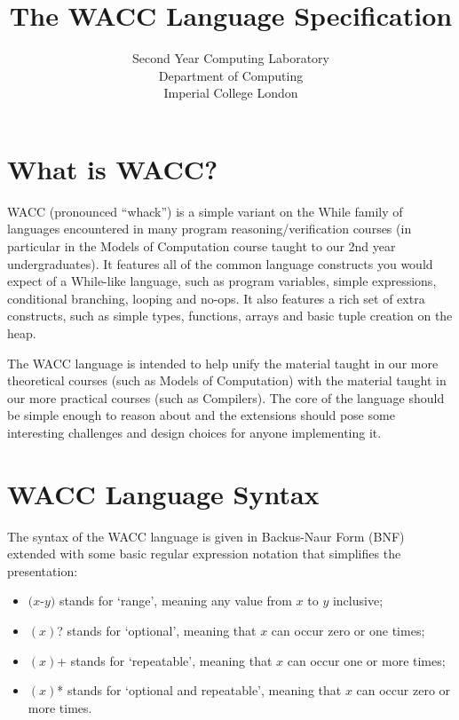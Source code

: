 \documentclass[a4paper]{article}
\theoremstyle{definition}
\begin{document}
\title{The WACC Language Specification}
\date{}
\author{
Second Year Computing Laboratory \\
Department of Computing \\
Imperial College London
}

\maketitle

\section{What is WACC?}
WACC (pronounced ``whack'') is a simple variant on the While family of languages encountered in many program reasoning/verification courses
(in particular in the Models of Computation course taught to our 2nd year undergraduates).
It features all of the common language constructs you would expect of a While-like language,
such as program variables, simple expressions, conditional branching, looping and no-ops.
It also features a rich set of extra constructs, such as simple types, functions, arrays and basic tuple creation on the heap.

The WACC language is intended to help unify the material taught in our more theoretical courses (such as Models of Computation)
with the material taught in our more practical courses (such as Compilers).
The core of the language should be simple enough to reason about
and the extensions should pose some interesting challenges and design choices for anyone implementing it.


\section{WACC Language Syntax}
The syntax of the WACC language is given in Backus-Naur Form (BNF)
extended with some basic regular expression notation that simplifies the presentation:
\begin{itemize}
 \item $(x$-$y)$ stands for `range', meaning any value from $x$ to $y$ inclusive;
 \item $(x)$? stands for `optional', meaning that $x$ can occur zero or one times;
 \item $(x)$+ stands for `repeatable', meaning that $x$ can occur one or more times;
 \item $(x)$* stands for `optional and repeatable', meaning that $x$ can occur zero or more times.
\end{itemize}
\end{document}
